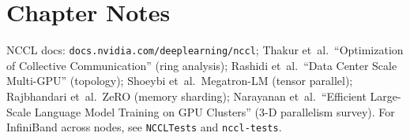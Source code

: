 \section{Chapter Notes}
NCCL docs: \texttt{docs.nvidia.com/deeplearning/nccl}; Thakur et~al.\ ``Optimization of Collective Communication'' (ring analysis); Rashidi et~al.\ ``Data Center Scale Multi-GPU'' (topology); Shoeybi et~al.\ Megatron-LM (tensor parallel); Rajbhandari et~al.\ ZeRO (memory sharding); Narayanan et~al.\ ``Efficient Large-Scale Language Model Training on GPU Clusters'' (3-D parallelism survey). For InfiniBand across nodes, see \texttt{NCCLTests} and \texttt{nccl-tests}.
